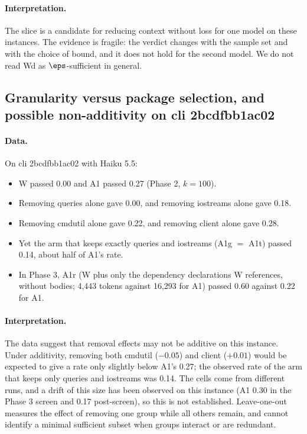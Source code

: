 \paragraph{Interpretation.} The slice is a candidate for reducing context without loss for one model on these instances. The evidence is fragile: the verdict changes with the sample set and with the choice of bound, and it does not hold for the second model. We do not read Wd as $\eps$-sufficient in general.

\subsection{Granularity versus package selection, and possible non-additivity on cli 2bcdfbb1ac02}

\paragraph{Data.} On cli 2bcdfbb1ac02 with Haiku 5.5:
\begin{itemize}
\item W passed 0.00 and A1 passed 0.27 (Phase 2, $k=100$).
\item Removing queries alone gave 0.00, and removing iostreams alone gave 0.18.
\item Removing cmdutil alone gave 0.22, and removing client alone gave 0.28.
\item Yet the arm that keeps exactly queries and iostreams (A1g $=$ A1t) passed 0.14, about half of A1's rate.
\item In Phase 3, A1r (W plus only the dependency declarations W references, without bodies; 4,443 tokens against 16,293 for A1) passed 0.60 against 0.22 for A1.
\end{itemize}

\paragraph{Interpretation.} The data suggest that removal effects may not be additive on this instance. Under additivity, removing both cmdutil ($-0.05$) and client ($+0.01$) would be expected to give a rate only slightly below A1's 0.27; the observed rate of the arm that keeps only queries and iostreams was 0.14. The cells come from different runs, and a drift of this size has been observed on this instance (A1 0.30 in the Phase 3 screen and 0.17 post-screen), so this is not established. Leave-one-out measures the effect of removing one group while all others remain, and cannot identify a minimal sufficient subset when groups interact or are redundant.

